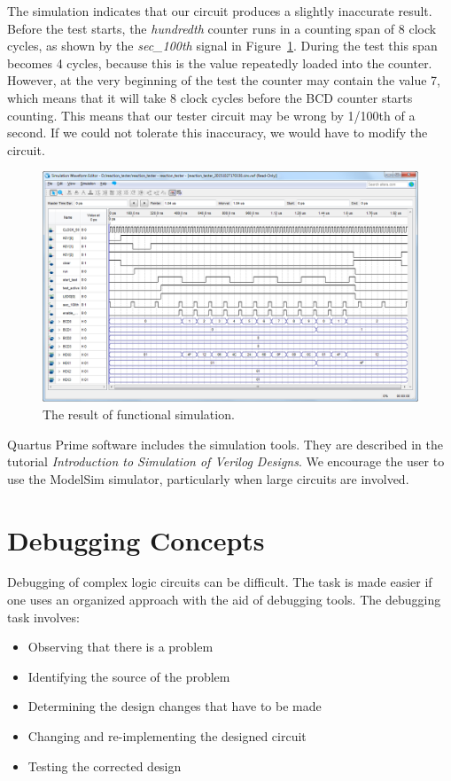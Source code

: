 \documentclass[11pt, twoside, pdftex]{article}
\begin{document}
The simulation indicates that our circuit produces a slightly inaccurate result.
Before the test starts, the {\it hundredth} counter runs in a counting span
of 8 clock cycles, as shown by the {\it sec\_100th} signal in Figure~\ref{fig:20}.
During the test this span becomes 4 cycles, because this is
the value repeatedly loaded into the counter. However, at the very beginning of
the test the counter may contain the value 7, which means that it will take 8
clock cycles before the BCD counter starts counting. This means that our tester
circuit may be wrong by 1/100th of a second. If we could not tolerate this
inaccuracy, we would have to modify the circuit.

\begin{figure}[H]
   \begin{center}
      \includegraphics[scale=0.5]{figures/figure20.png}
   \caption{The result of functional simulation.} 
	 \label{fig:20}
	 \end{center}
\end{figure}

Quartus Prime software includes the simulation tools. They are described in
the tutorial {\it Introduction to Simulation of Verilog Designs}.
We encourage the user to use the ModelSim simulator, particularly when large
circuits are involved.

\section{Debugging Concepts}
Debugging of complex logic circuits can be difficult. The task is made easier
if one uses an organized approach with the aid of debugging tools.
The debugging task involves:
\begin{itemize}
\item Observing that there is a problem
\item Identifying the source of the problem
\item Determining the design changes that have to be made
\item Changing and re-implementing the designed circuit 
\item Testing the corrected design
\end{itemize}
\end{document}

